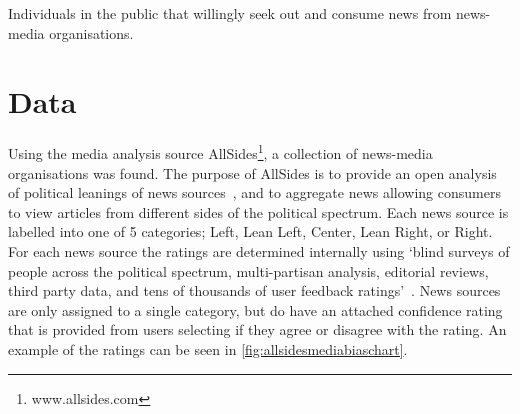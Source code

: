 \begin{definition}[Consumers]
	Individuals in the public that willingly seek out and consume news from news-media organisations.
\end{definition}

\section{Data}

Using the media analysis source AllSides\footnote{www.allsides.com}, a collection of news-media organisations was found. The purpose of AllSides is to provide an open  analysis of political leanings of news sources~\cite{gable_media_2019}, and to aggregate news allowing consumers to view articles from different sides of the political spectrum. Each news source is labelled into one of 5 categories; {\color{Left}Left},
{\color{LeanLeft}Lean Left},
{\color{Center}Center},
{\color{LeanRight}Lean Right}, or
{\color{Right}Right}.
For each news source the ratings are determined internally using `blind surveys of people across the political spectrum, multi-partisan analysis, editorial reviews, third party data, and tens of thousands of user feedback ratings'~\cite{gable_media_2019}. News sources are only assigned to a single category, but do have an attached confidence rating that is provided from users selecting if they agree or disagree with the rating. An example of the ratings can be seen in \autoref{fig:allsidesmediabiaschart}.

